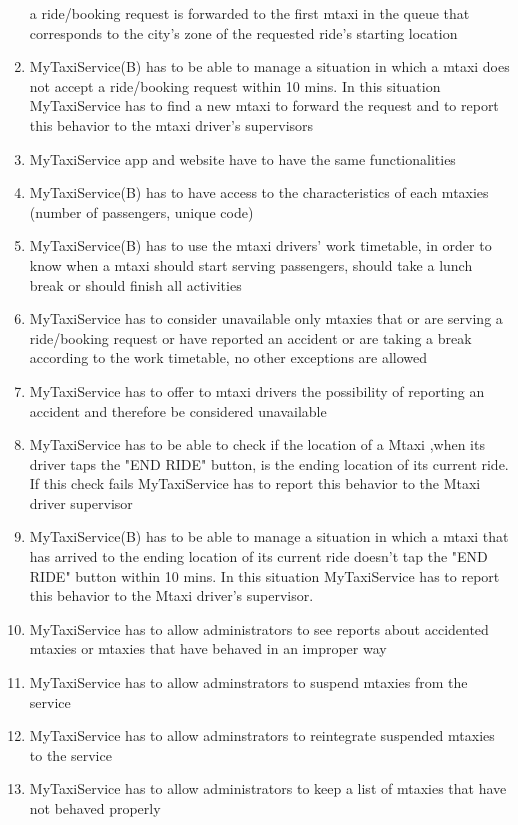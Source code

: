 \documentclass[11pt,titlepage]{article} %
\begin{document}
\begin{enumerate}
	      a ride/booking request is forwarded to the first mtaxi in the queue that corresponds to the city's zone of the requested ride's
	      starting location
	      \item MyTaxiService(B) has to be able to manage a situation in which a mtaxi does not accept a ride/booking request within 10 mins.
	      In this situation MyTaxiService has to find a new mtaxi to forward the request and to report this behavior to the mtaxi driver's supervisors
	      \item MyTaxiService app and website have to  have the same functionalities
	      \item MyTaxiService(B) has to have access to the characteristics of each mtaxies (number of passengers, unique code)
	      \item MyTaxiService(B) has to use the mtaxi drivers' work timetable, in order to know when a mtaxi should start
	      serving passengers, should take a lunch break or should finish all activities
	      \item MyTaxiService has to consider unavailable only mtaxies that or are serving a ride/booking request or have reported an accident or
	      are taking a break according to the work timetable, no other exceptions are allowed
	      \item MyTaxiService has to offer to mtaxi drivers the possibility of reporting an accident and therefore be considered unavailable
	      \item MyTaxiService has to be able to check if the location of a Mtaxi ,when its driver taps the "END RIDE" button, is the ending location of its current ride. If this check fails MyTaxiService has to report this behavior to the Mtaxi driver supervisor
	      \item MyTaxiService(B) has to be able to manage a situation in which a mtaxi that has arrived to the ending location of its current ride doesn't tap the "END RIDE" button within 10 mins. In this situation MyTaxiService has to report this behavior to the Mtaxi driver's supervisor.
        	      \item MyTaxiService has to allow administrators to see reports about accidented mtaxies or mtaxies that have behaved in an improper way
        	      \item MyTaxiService has to allow adminstrators to suspend mtaxies from the service
        	      \item MyTaxiService has to allow adminstrators to reintegrate suspended mtaxies to the service
                \item MyTaxiService has to allow administrators to keep a list of mtaxies that have not behaved properly
	\end{enumerate}
\end{document}
